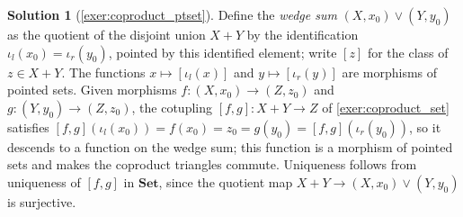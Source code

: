 \documentclass[a4paper,11pt, oneside,titlepage=false]{scrbook}
\theoremstyle{plain}
\theoremstyle{definition}
\newtheorem{solution}[thm]{Solution}
\newcommand{\Catb}[1]{\mathbf{#1}}
\newcommand{\SET}{\Catb{Set}}
\newcommand{\inl}{\ensuremath{\iota_l}}
\newcommand{\inr}{\ensuremath{\iota_r}}
\begin{document}
\begin{solution}[\cref{exer:coproduct_ptset}]\label{sol:coproduct_ptset}
  Define the \emph{wedge sum} $(X,x_0) \vee (Y,y_0)$ as the quotient of the
  disjoint union $X + Y$ by the identification $\inl(x_0) = \inr(y_0)$, pointed
  by this identified element; write $[z]$ for the class of $z \in X + Y$.
  The functions $x \mapsto [\inl(x)]$ and $y \mapsto [\inr(y)]$ are morphisms of
  pointed sets.
  Given morphisms $f : (X,x_0) \to (Z,z_0)$ and $g : (Y,y_0) \to (Z,z_0)$, the
  cotupling $[f,g] : X + Y \to Z$ of \cref{exer:coproduct_set} satisfies
  $[f,g](\inl(x_0)) = f(x_0) = z_0 = g(y_0) = [f,g](\inr(y_0))$, so it descends
  to a function on the wedge sum; this function is a morphism of pointed sets
  and makes the coproduct triangles commute.
  Uniqueness follows from uniqueness of $[f,g]$ in $\SET$, since the quotient
  map $X + Y \to (X,x_0) \vee (Y,y_0)$ is surjective.
\end{solution}

\end{document}
